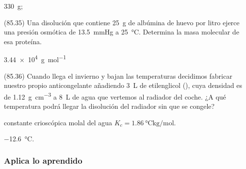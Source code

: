   \begin{solution}
    \begin{enumerate*}
      \item \SI{330}{\gram};
      \item {}
    \end{enumerate*}
  \end{solution}




  \begin{exercise}[
      tags    = {},
      topics  = {química,química básica},
      source  = {FQ 1B MGH 2016, p85, e35},
    ]
    (85.35) Una disolución que contiene \SI{25}{\gram} de albúmina de
    huevo por litro ejerce una presión osmótica de \SI{13.5}{\mmHg} a
    \SI{25}{\celsius}. Determina la masa molecular de esa proteína.
  \end{exercise}

  \begin{solution}
    \SI{3.44e4}{\gram\per\mole}
  \end{solution}



  \begin{exercise}[
      tags    = {},
      topics  = {química,química básica},
      source  = {FQ 1B MGH 2016, p85, e36},
    ]
    (85.36) Cuando llega el invierno y bajan las temperaturas decidimos fabricar nuestro propio anticongelante añadiendo \SI{3}{\liter} de etilenglicol (), cuya densidad es de \SI{1.12}{\gram\per\cubic\centi\meter} a \SI{8}{\liter} de agua que vertemos al radiador del coche. ¿A qué temperatura podrá llegar la disolución del radiador sin que se congele?

    \begin{gexdatos}
      constante crioscópica molal del agua \( K_c = \SI{1.86}{\celsius\kilo\gram\per\mole} \).
    \end{gexdatos}
  \end{exercise}

  \begin{solution}
    \SI{-12.6}{\celsius}.
  \end{solution}





  \subsubsection*{Aplica lo aprendido}


